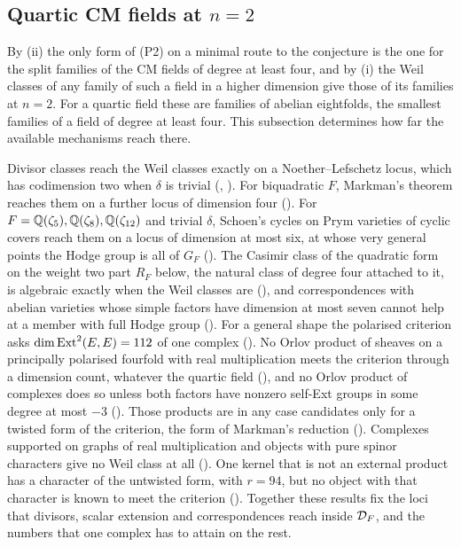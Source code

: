 \subsection{Quartic CM fields at \texorpdfstring{$n=2$}{n=2}}
\label{ssec:quartic}

By (ii) the only form of (P2) on a minimal route to the
conjecture is the one for the split families of the CM fields of degree at
least four, and by (i) the Weil classes of any family of
such a field in a higher dimension give those of its families at $n=2$. For a
quartic field these are families of abelian eightfolds, the smallest
families of a field of degree at least four. This subsection determines how
far the available mechanisms reach there.

Divisor classes reach the Weil classes exactly on a Noether--Lefschetz locus,
which has codimension two when $\delta$ is trivial (,
). For biquadratic $F$, Markman's theorem reaches them
on a further locus of dimension four (). For
$F=\mathbb{Q}(\zeta_{5}),\mathbb{Q}(\zeta_{8}),\mathbb{Q}(\zeta_{12})$ and trivial $\delta$,
Schoen's cycles on Prym varieties of cyclic covers reach them on a locus of
dimension at most six, at whose very general points the Hodge group is all of
$G_{F}$ (). The Casimir class of the quadratic form on
the weight two part $R_{F}$ below, the natural class of degree four attached
to it, is algebraic exactly when the Weil classes are
(), and correspondences with abelian varieties whose
simple factors have dimension at most seven cannot help at a member with full
Hodge group (). For a general shape the polarised
criterion asks $\dim\operatorname{Ext}^{2}(E,E)=112$ of one complex
(). No Orlov product of sheaves on a principally
polarised fourfold with real multiplication meets the criterion through a
dimension count, whatever the quartic field (),
and no Orlov product of complexes does so unless both factors have nonzero self-Ext
groups in some degree at most $-3$ (). Those products
are in any case candidates only for a twisted form of the criterion, the form
of Markman's reduction (). Complexes supported on
graphs of real multiplication and objects with pure spinor characters give no
Weil class at all (). One kernel that is not an
external product has a character of the untwisted form, with $r=94$, but no
object with that character is known to meet the criterion
(). Together these results fix the loci that
divisors, scalar extension and correspondences reach inside $\mathcal{D}_{F}$, and
the numbers that one complex has to attain on the rest.


